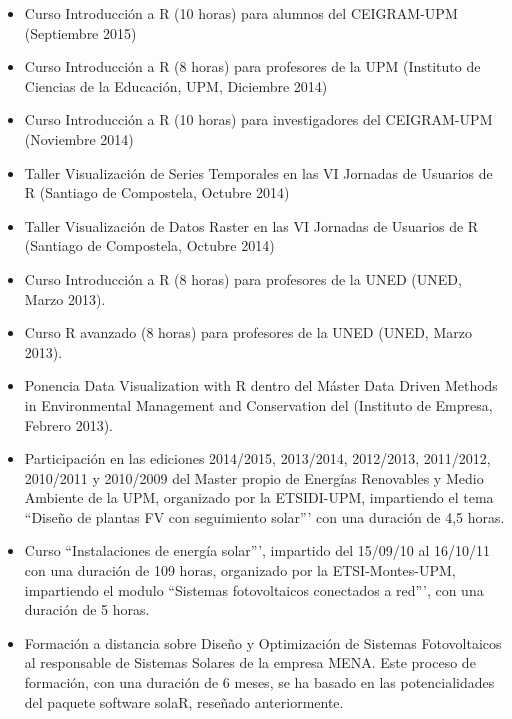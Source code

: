 \documentclass[article, a4paper]{memoir}
\begin{document}
\begin{itemize}
\item Curso \guillemotleft{}Introducción a R\guillemotright{} (10 horas) para alumnos del CEIGRAM-UPM (Septiembre 2015)

\item Curso \guillemotleft{}Introducción a R\guillemotright{} (8 horas) para profesores de la UPM (Instituto de Ciencias de la Educación, UPM, Diciembre 2014)

\item Curso \guillemotleft{}Introducción a R\guillemotright{} (10 horas) para investigadores del CEIGRAM-UPM (Noviembre 2014)

\item Taller \guillemotleft{}Visualización de Series Temporales\guillemotright{} en las VI Jornadas de Usuarios de R (Santiago de Compostela, Octubre 2014)

\item Taller \guillemotleft{}Visualización de Datos Raster\guillemotright{} en las VI Jornadas de Usuarios de R (Santiago de Compostela, Octubre 2014)

\item Curso \guillemotleft{}Introducción a R\guillemotright{} (8 horas) para profesores de la UNED (UNED, Marzo 2013).

\item Curso \guillemotleft{}R avanzado\guillemotright{} (8 horas) para profesores de la UNED (UNED, Marzo 2013).

\item Ponencia \guillemotleft{}Data Visualization with R\guillemotright{} dentro del Máster \guillemotleft{}Data Driven Methods in Environmental Management and Conservation\guillemotright{} del (Instituto de Empresa, Febrero 2013).

\item Participación en las ediciones 2014/2015, 2013/2014, 2012/2013, 2011/2012, 2010/2011 y 2010/2009 del Master propio de Energías Renovables y Medio Ambiente de la UPM, organizado por la ETSIDI-UPM, impartiendo el tema ``Diseño de plantas FV con seguimiento solar''' con una duración de 4,5 horas.

\item Curso ``Instalaciones de energía solar''', impartido del 15/09/10 al 16/10/11 con una duración de 109 horas, organizado por la ETSI-Montes-UPM, impartiendo el modulo ``Sistemas fotovoltaicos conectados a red''', con una duración de 5 horas.

\item Formación a distancia sobre Diseño y Optimización de Sistemas Fotovoltaicos al responsable de Sistemas Solares de la empresa MENA. Este proceso de formación, con una duración de 6 meses, se ha basado en las potencialidades del paquete software solaR, reseñado anteriormente.


\end{itemize}
\end{document}
